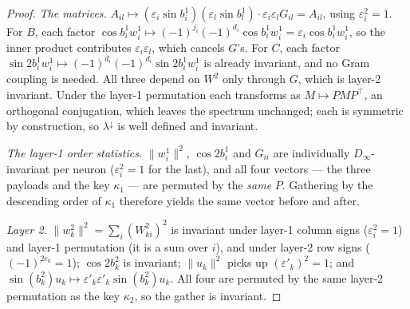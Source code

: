 \documentclass[10pt,twocolumn,letterpaper]{article}
\theoremstyle{definition}
\newcommand{\Dinf}{D_\infty}
\begin{document}
\begin{proof}
\emph{The matrices.} $A_{il} \mapsto (\varepsilon_i\sin b^1_i)(\varepsilon_l \sin b^1_l)\cdot
\varepsilon_i\varepsilon_l G_{il} = A_{il}$, using $\varepsilon_i^2 = 1$. For $B$, each factor
$\cos b^1_i w^1_i \mapsto (-1)^{j_i}(-1)^{d_i}\cos b^1_i w^1_i = \varepsilon_i \cos b^1_i w^1_i$,
so the inner product contributes $\varepsilon_i\varepsilon_l$, which cancels $G$'s. For $C$, each
factor $\sin 2b^1_i w^1_i \mapsto (-1)^{d_i}(-1)^{d_i}\sin 2b^1_i w^1_i$ is already invariant, and
no Gram coupling is needed. All three depend on $W^2$ only through $G$, which is layer-2 invariant.
Under the layer-1 permutation each transforms as $M \mapsto PMP^\top$, an orthogonal conjugation,
which leaves the spectrum unchanged; each is symmetric by construction, so
$\lambda^{\downarrow}$ is well defined and invariant.

\emph{The layer-1 order statistics.} $\|w^1_i\|^2$, $\cos 2b^1_i$ and $G_{ii}$ are individually
$\Dinf$-invariant per neuron ($\varepsilon_i^2 = 1$ for the last), and all four vectors --- the
three payloads and the key $\kappa_1$ --- are permuted by the \emph{same} $P$. Gathering by the
descending order of $\kappa_1$ therefore yields the same vector before and after.

\emph{Layer 2.} $\|w^2_k\|^2 = \sum_i (W^2_{ki})^2$ is invariant under layer-1 column signs
($\varepsilon_i^2=1$) and layer-1 permutation (it is a sum over $i$), and under layer-2 row signs
($(-1)^{2e_k}=1$); $\cos 2b^2_k$ is invariant; $\|u_k\|^2$ picks up $(\varepsilon'_k)^2 = 1$; and
$\sin(b^2_k)u_k \mapsto \varepsilon'_k\varepsilon'_k \sin(b^2_k)u_k$. All four are permuted by the
same layer-2 permutation as the key $\kappa_2$, so the gather is invariant.
\end{proof}
\end{document}
